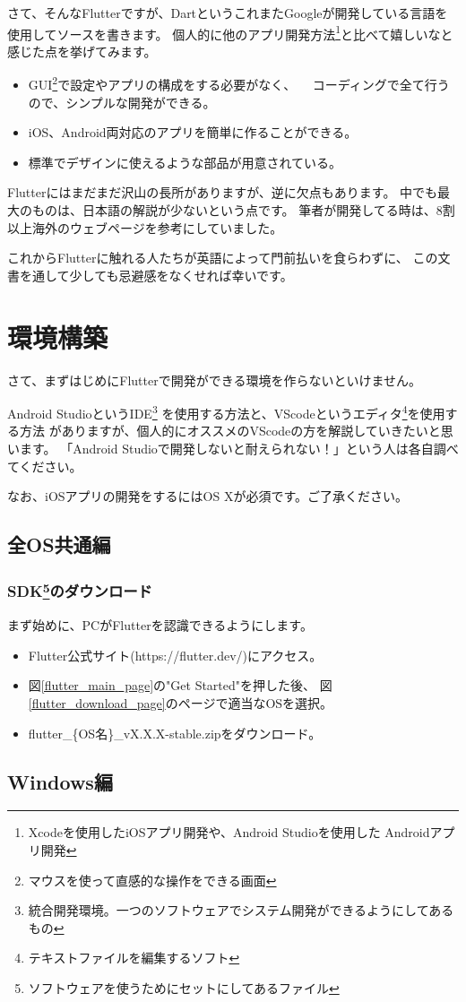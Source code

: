 \documentclass{jsarticle}
\begin{document}
        さて、そんなFlutterですが、DartというこれまたGoogleが開発している言語を使用してソースを書きます。
        個人的に他のアプリ開発方法\footnote{Xcodeを使用したiOSアプリ開発や、Android Studioを使用した
        Androidアプリ開発}と比べて嬉しいなと感じた点を挙げてみます。

        \begin{itemize}
            \item GUI\footnote{マウスを使って直感的な操作をできる画面}で設定やアプリの構成をする必要がなく、
                　コーディングで全て行うので、シンプルな開発ができる。
            \item iOS、Android両対応のアプリを簡単に作ることができる。
            \item 標準でデザインに使えるような部品が用意されている。
        \end{itemize}

        Flutterにはまだまだ沢山の長所がありますが、逆に欠点もあります。
        中でも最大のものは、日本語の解説が少ないという点です。
        筆者が開発してる時は、8割以上海外のウェブページを参考にしていました。
        
        これからFlutterに触れる人たちが英語によって門前払いを食らわずに、
        この文書を通して少しても忌避感をなくせれば幸いです。

    \section*{環境構築}
        さて、まずはじめにFlutterで開発ができる環境を作らないといけません。

        Android StudioというIDE\footnote{統合開発環境。一つのソフトウェアでシステム開発ができるようにしてあるもの}
        を使用する方法と、VScodeというエディタ\footnote{テキストファイルを編集するソフト}を使用する方法
        がありますが、個人的にオススメのVScodeの方を解説していきたいと思います。
        「Android Studioで開発しないと耐えられない！」という人は各自調べてください。

        なお、iOSアプリの開発をするにはOS Xが必須です。ご了承ください。

        \subsection*{全OS共通編}
            \subsubsection*{SDK\footnote{ソフトウェアを使うためにセットにしてあるファイル}のダウンロード}
                まず始めに、PCがFlutterを認識できるようにします。
            \begin{itemize}
                \item Flutter公式サイト(https://flutter.dev/)にアクセス。
                \item 図\ref{flutter_main_page}の"Get Started"を押した後、
                      図\ref{flutter_download_page}のページで適当なOSを選択。
                \item flutter\_\{OS名\}\_vX.X.X-stable.zipをダウンロード。
            \end{itemize}

        \subsection*{Windows編}
            
\end{document}
